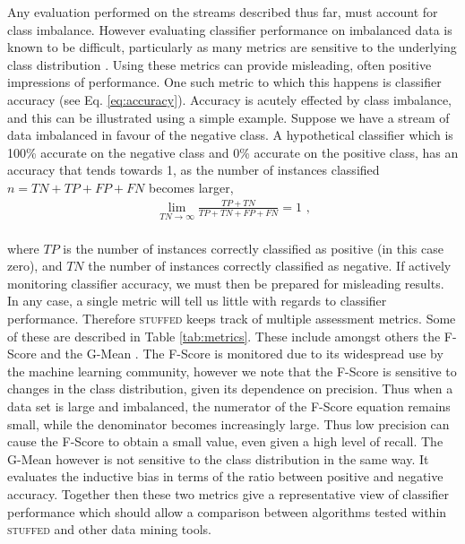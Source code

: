 \documentclass[twoside,a4paper]{refart}
\begin{document}
Any evaluation performed on the streams described thus far, must account for class imbalance. However evaluating classifier performance on imbalanced data is known to be difficult, particularly as many metrics are sensitive to the underlying class distribution \cite{Haibo:2009:fb}. Using these metrics can provide misleading, often positive impressions of performance. One such metric to which this happens is classifier accuracy (see Eq. \ref{eq:accuracy}). Accuracy is acutely effected by class imbalance, and this can be illustrated using a simple example. Suppose we have a stream of data imbalanced in favour of the negative class. A hypothetical classifier which is 100\% accurate on the negative class and 0\% accurate on the positive class, has an accuracy that tends towards 1, as the number of instances classified $n=TN+TP+FP+FN$ becomes larger,\\
\begin{eqnarray} \label{eq:limi1}
\lim_{TN\to \infty} \frac{TP+TN}{TP+TN+FP+FN} = 1 \textrm{ ,}
\end{eqnarray}\\
where $TP$ is the number of instances correctly classified as positive (in this case zero), and $TN$ the number of instances correctly classified as negative. If actively monitoring classifier accuracy, we must then be prepared for misleading results. In any case, a single metric will tell us little with regards to classifier performance. Therefore \textsc{stuffed} keeps track of multiple assessment metrics. Some of these are described in Table \ref{tab:metrics}. 
\newpage
These include amongst others the F-Score and the G-Mean \cite{Haibo:2009:fb}. The F-Score is monitored due to its widespread use by the machine learning community, however we note that the F-Score is sensitive to changes in the class distribution, given its dependence on precision. Thus when a data set is large and imbalanced, the numerator of the F-Score equation remains small, while the denominator becomes increasingly large. Thus low precision can cause the F-Score to obtain a small value, even given a high level of recall. The G-Mean however is not sensitive to the class distribution in the same way. It evaluates the inductive bias in terms of the ratio between positive and negative accuracy. Together then these two metrics give a representative view of classifier performance which should allow a comparison between algorithms tested within \textsc{stuffed} and other data mining tools.
\end{document}
